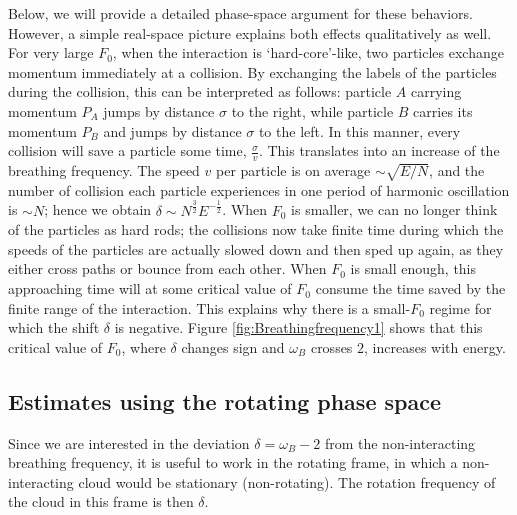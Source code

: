 \documentclass[aps,preprintnumbers,onecolumn,amsmath,amssymb,floatfix,pra]{revtex4-1}
\begin{document}
Below, we will provide a detailed phase-space argument for these behaviors.  However, a simple
real-space picture explains both effects qualitatively as well.  For very large $F_0$, when the
interaction is `hard-core'-like, two particles exchange momentum immediately at a collision.  By
exchanging the labels of the particles during the collision, this can be interpreted as follows:
particle $A$ carrying momentum $P_A$ jumps by distance $\sigma$ to the right, while particle $B$
carries its momentum $P_B$ and jumps by distance $\sigma$ to the left.  In this manner, every
collision will save a particle some time, $\frac{\sigma}{v}$.  This translates into an increase of
the breathing frequency.  The speed $v$ per particle is on average $\sim\sqrt{E/N}$, and the number
of collision each particle experiences in one period of harmonic oscillation is $\sim N$; hence we
obtain $\delta\sim N^{\frac{3}{2}}E^{-\frac{1}{2}}$.  When $F_0$ is smaller, we can no longer think
of the particles as hard rods; the collisions now take finite time during which the speeds of the
particles are actually slowed down and then sped up again, as they either cross paths or bounce from
each other.  When $F_0$ is small enough, this approaching time will at some critical value of $F_0$
consume the time saved by the finite range of the interaction.  This explains why there is a
small-$F_0$ regime for which the shift $\delta$ is negative.  Figure \ref{fig:Breathingfrequency1}
shows that this critical value of $F_0$, where $\delta$ changes sign and $\omega_B$ crosses $2$,
increases with energy.


\subsection{Estimates using the rotating phase space}

Since we are interested in the deviation $\delta=\omega_B-2$ from the non-interacting breathing
frequency, it is useful to work in the rotating frame, in which a non-interacting cloud would be
stationary (non-rotating).  The rotation frequency of the cloud in this frame is then $\delta$.
\end{document}
